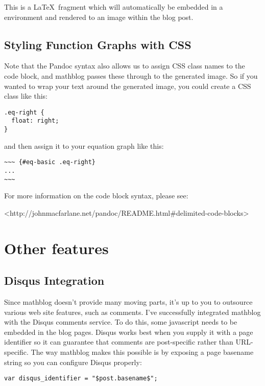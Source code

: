 \documentclass[11pt, letterpaper, oneside, titlepage]{book}
\begin{document}
This is a \LaTeX\ fragment which will automatically be embedded in a
 environment and rendered to an image within the blog
post.

\subsection{Styling Function Graphs with CSS}

Note that the Pandoc syntax also allows us to assign CSS class names
to the code block, and mathblog passes these through to the generated
image.  So if you wanted to wrap your text around the generated image,
you could create a CSS class like this:

\begin{verbatim}
.eq-right {
  float: right;
}
\end{verbatim}

and then assign it to your equation graph like this:

\begin{verbatim}
~~~ {#eq-basic .eq-right}
...
~~~
\end{verbatim}

For more information on the code block syntax, please see:

<http://johnmacfarlane.net/pandoc/README.html\#delimited-code-blocks>

\section{Other features}

\subsection{Disqus Integration}

Since mathblog doesn't provide many moving parts, it's up to you to
outsource various web site features, such as comments.  I've
successfully integrated mathblog with the Disqus comments service.  To
do this, some javascript needs to be embedded in the blog pages.
Disqus works best when you supply it with a page identifier so it can
guarantee that comments are post-specific rather than URL-specific.
The way mathblog makes this possible is by exposing a page basename
string so you can configure Disqus properly:

\begin{verbatim}
var disqus_identifier = "$post.basename$";
\end{verbatim}
\end{document}
